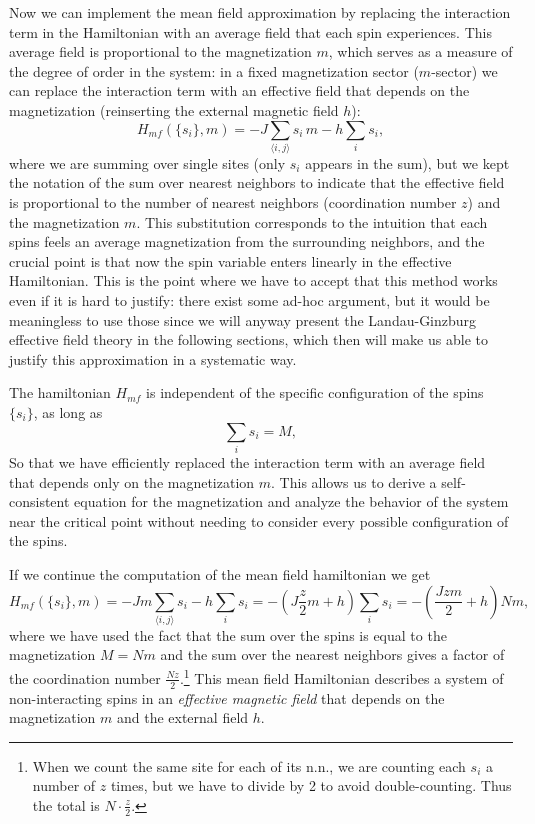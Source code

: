 Now we can implement the mean field approximation by replacing the interaction term in the Hamiltonian with an average field that each spin experiences. This average field is proportional to the magnetization \(m\), which serves as a measure of the degree of order in the system: in a fixed magnetization sector (\(m\)-sector) we can replace the interaction term with an effective field that depends on the magnetization (reinserting the external magnetic field \(h\)):
\[
    H_{mf} (\{s_i\}, m) = -J \sum_{\langle i, j \rangle} s_i \, m - h \sum_i s_i,
\]
where we are summing over single sites (only \(s_i\) appears in the sum), but we kept the notation of the sum over nearest neighbors to indicate that the effective field is proportional to the number of nearest neighbors (coordination number \(z\)) and the magnetization \(m\). This substitution corresponds to the intuition that each spins feels an average magnetization from the surrounding neighbors, and the crucial point is that now the spin variable enters linearly in the effective Hamiltonian. This is the point where we have to accept that this method works even if it is hard to justify: there exist some ad-hoc argument, but it would be meaningless to use those since we will anyway present the Landau-Ginzburg effective field theory in the following sections, which then will make us able to justify this approximation in a systematic way.

\begin{remark}
    The hamiltonian \(H_{mf}\) is independent of the specific configuration of the spins \(\{s_i\}\), as long as
    \[
        \sum_{i} s_i = M,
    \]
    So that we have efficiently replaced the interaction term with an average field that depends only on the magnetization \(m\). This allows us to derive a self-consistent equation for the magnetization and analyze the behavior of the system near the critical point without needing to consider every possible configuration of the spins.
\end{remark}

If we continue the computation of the mean field hamiltonian  we get
\[
    H_{mf} (\{s_i\}, m) = -J m \sum_{\langle i, j \rangle} s_i - h \sum_i s_i = - (J \frac{z}{2} m + h) \sum_i s_i = - (\frac{J z m}{2} + h) Nm,
\]
where we have used the fact that the sum over the spins is equal to the magnetization \(M = Nm\) and the sum over the nearest neighbors gives a factor of the coordination number \(\frac{Nz}{2}\).\footnote{When we count the same site for each of its n.n., we are counting each \(s_i\) a number of \(z\) times, but we have to divide by 2 to avoid double-counting. Thus the total is \(N\cdot \frac{z}{2}\).} This mean field Hamiltonian describes a system of non-interacting spins in an \textit{effective magnetic field} that depends on the magnetization \(m\) and the external field \(h\).

